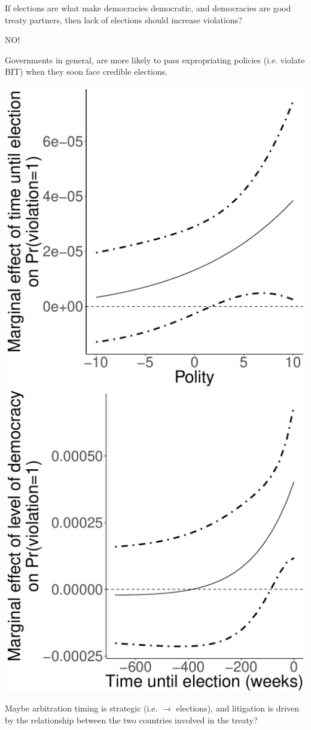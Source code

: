 \documentclass{beamer}
\begin{document}
\begin{frame}{\large If elections are what make democracies democratic, and democracies are good treaty partners, then lack of elections should increase violations?}

\begin{center}
	\pause
	{\Large NO!}
\end{center}
\end{frame}

\begin{frame}{\large Governments in general, are more likely to pass expropriating policies (i.e. violate BIT) when they soon face credible elections.}

\includegraphics[width=.49\linewidth]{figures/polity2Effect.pdf}
\includegraphics[width=.49\linewidth]{figures/timeUntilAnyElecEffect.pdf}

\begin{center}
	\pause
	{Maybe arbitration timing is strategic (i.e. $\rightarrow$ elections), and litigation is driven by the relationship between the two countries involved in the treaty?}
\end{center}
\end{frame}
\end{document}

